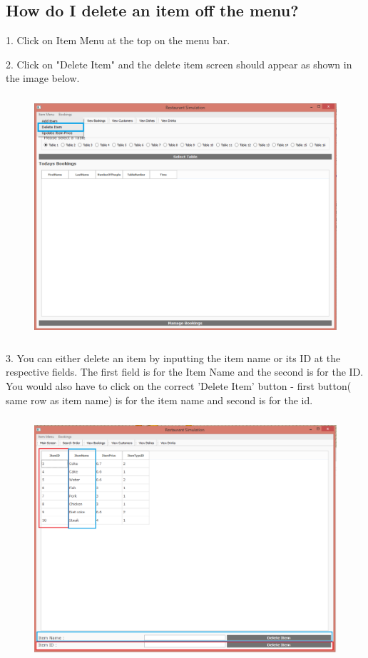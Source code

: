 \subsection{How do I delete an item off the menu?}
1. Click on Item Menu at the top on the menu bar.

2. Click on "Delete Item" and the delete item screen should appear as shown in the image below.

\begin{figure}[H]
    \includegraphics[height = 9cm]{./Manual/images/DeleteItem1} 
    \caption{} \label{fig:deleteitem1}
\end{figure}

3.  You can either delete an item by inputting the item name or its ID at the respective fields. The first field is for the Item Name and the second is for the ID. You would also have to click on the correct 'Delete Item' button - first button( same row as item name) is for the item name and second is for the id.

\begin{figure}[H]
    \includegraphics[height = 9cm]{./Manual/images/DeleteItem2} 
    \caption{} \label{fig:deleteitem2}
\end{figure}

